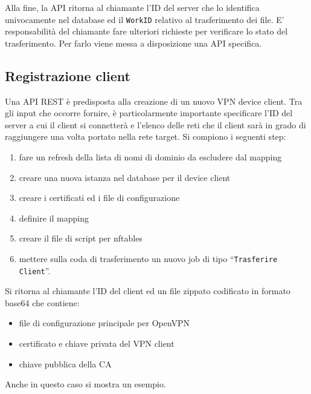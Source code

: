 Alla fine, la API ritorna al chiamante l'ID del server che lo identifica univocamente
nel database ed il \texttt{WorkID} relativo al trasferimento dei file. E' responsabilità
del chiamante fare ulteriori richieste per verificare lo stato del trasferimento. Per farlo
viene messa a disposizione una API specifica.

\subsection{Registrazione client}
Una API REST è predisposta alla creazione di un nuovo VPN device client. Tra gli input
che occorre fornire, è particolarmente importante specificare l'ID del server a cui
il client si connetterà e l'elenco delle reti che il client sarà in grado di
raggiungere una volta portato nella rete target.
Si compiono i seguenti step:
\begin{enumerate}
    \item fare un refresh della lista di nomi di dominio da escludere dal mapping
    \item creare una nuova istanza nel database per il device client
    \item creare i certificati ed i file di configurazione
    \item definire il mapping
    \item creare il file di script per nftables
    \item mettere sulla coda di trasferimento un nuovo job di tipo ``\texttt{Trasferire Client}''.
\end{enumerate}

Si ritorna al chiamante l'ID del client ed un file zippato codificato in formato
base64 che contiene:
\begin{itemize}
    \item file di configurazione principale per OpenVPN
    \item certificato e chiave privata del VPN client
    \item chiave pubblica della CA
\end{itemize}
Anche in questo caso si mostra un esempio.
\inputminted[tabsize=4, breaklines]{python}{code_samples/controllers_create_client.py}